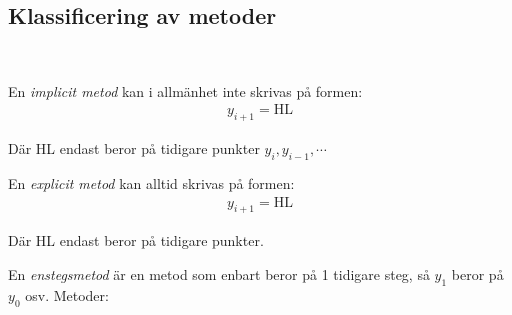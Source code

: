 \subsection{Klassificering av metoder}\hfill\\
\par\bigskip
\noindent En \textit{implicit metod} kan i allmänhet inte skrivas på formen:
\begin{equation*}
  \begin{gathered}
    y_{i+1}=\text{HL}
  \end{gathered}
\end{equation*}
\par\noindent Där HL endast beror på tidigare punkter $y_i, y_{i-1},\cdots$ 
\par\bigskip
\noindent En \textit{explicit metod} kan alltid skrivas på formen:
\begin{equation*}
  \begin{gathered}
    y_{i+1}=\text{HL}
  \end{gathered}
\end{equation*}\par
\noindent Där HL endast beror på tidigare punkter.
\par\bigskip
\noindent En \textit{enstegsmetod} är en metod som enbart beror på 1 tidigare steg, så $y_1$ beror på $y_0$ osv. Metoder:
\par\bigskip
